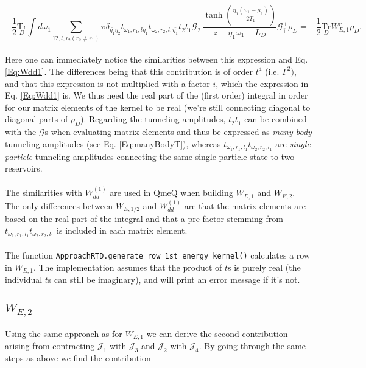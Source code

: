 \documentclass{article}
\newcommand{\G}{\ensuremath{\mathcal{G}}}
\newcommand{\J}{\ensuremath{\mathcal{J}}}
\newcommand{\Tru}[1]{\ensuremath{\underset{#1}{\text{Tr}}}}
\begin{document}
\begin{equation}
     -\frac{1}{2}\Tru{D} \int d\omega_1\sum_{12,l,r_2 (r_2\ne r_1)}\pi\delta_{\bar{\eta_1}\eta_2}t_{\omega_1, r_1, l\eta_1}t_{\omega_2, r_2, l,\bar{\eta_1}}t_{\bar{2}}t_{\bar{1}}\G^-_{\bar{2}}\frac{\tanh\left ( \frac{\eta_1(\omega_1-\mu_1)}{2T_1} \right )}{z-\eta_1\omega_1-L_D}\G^{+}_{\bar{1}}\rho_D = -\frac{1}{2}\Tru{D} W_{E,1}^r\rho_D.
\end{equation}
\\
Here one can immediately notice the similarities between this expression and Eq. \ref{Eq:Wdd1}. The differences being that this contribution is of order $t^4$ (i.e. $\Gamma^2)$, and that this expression is not multiplied with a factor $i$, which the expression in Eq. \ref{Eq:Wdd1} is. We thus need the real part of the (first order) integral in order for our matrix elements of the kernel to be real (we're still connecting diagonal to diagonal parts of $\rho_D$). Regarding the tunneling amplitudes, $t_{\bar{2}}t_{\bar{1}}$ can be combined with the $\G$s when evaluating matrix elements and thus be expressed as \textit{many-body} tunneling amplitudes (see Eq. \ref{Eq:manyBodyT}), whereas $t_{\omega_1, r_1, l_1}t_{\omega_2, r_2, l_1}$ are \textit{single particle} tunneling amplitudes connecting the same single particle state to two reservoirs.
\\
\\
The similarities with $W_{dd}^{(1)}$ are used in QmeQ when building $W_{E,1}$ and $W_{E,2}$. The only differences between $W_{E,1/2}$ and $W_{dd}^{(1)}$ are that the matrix elements are based on the real part of the integral and that a pre-factor stemming from $t_{\omega_1, r_1, l_1}t_{\omega_2, r_2, l_1}$ is included in each matrix element.
\\
\\ 
The function \verb!ApproachRTD.generate_row_1st_energy_kernel()! calculates a row in $W_{E,1}$. The implementation assumes that the product of $t$s is purely real (the individual $t$s can still be imaginary), and will print an error message if it's not.
 \subsection{$W_{E,2}$}

Using the same approach as for $W_{E,1}$ we can derive the second contribution arising from contracting $\J_1$ with $\J_3$ and $\J_2$ with $\J_4$. By going through the same steps as above we find the contribution
\end{document}
